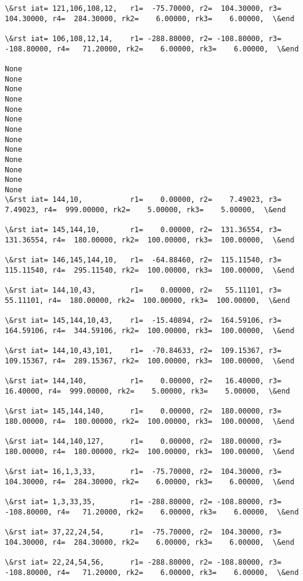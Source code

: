 \documentclass[11pt]{article}
\begin{document}
\begin{Verbatim}[commandchars=\\\{\}]
\&rst iat= 121,106,108,12,   r1=  -75.70000, r2=  104.30000, r3=  104.30000, r4=  284.30000, rk2=    6.00000, rk3=    6.00000,  \&end

\&rst iat= 106,108,12,14,    r1= -288.80000, r2= -108.80000, r3= -108.80000, r4=   71.20000, rk2=    6.00000, rk3=    6.00000,  \&end

None
None
None
None
None
None
None
None
None
None
None
None
None
\&rst iat= 144,10,           r1=    0.00000, r2=    7.49023, r3=    7.49023, r4=  999.00000, rk2=    5.00000, rk3=    5.00000,  \&end

\&rst iat= 145,144,10,       r1=    0.00000, r2=  131.36554, r3=  131.36554, r4=  180.00000, rk2=  100.00000, rk3=  100.00000,  \&end

\&rst iat= 146,145,144,10,   r1=  -64.88460, r2=  115.11540, r3=  115.11540, r4=  295.11540, rk2=  100.00000, rk3=  100.00000,  \&end

\&rst iat= 144,10,43,        r1=    0.00000, r2=   55.11101, r3=   55.11101, r4=  180.00000, rk2=  100.00000, rk3=  100.00000,  \&end

\&rst iat= 145,144,10,43,    r1=  -15.40894, r2=  164.59106, r3=  164.59106, r4=  344.59106, rk2=  100.00000, rk3=  100.00000,  \&end

\&rst iat= 144,10,43,101,    r1=  -70.84633, r2=  109.15367, r3=  109.15367, r4=  289.15367, rk2=  100.00000, rk3=  100.00000,  \&end

\&rst iat= 144,140,          r1=    0.00000, r2=   16.40000, r3=   16.40000, r4=  999.00000, rk2=    5.00000, rk3=    5.00000,  \&end

\&rst iat= 145,144,140,      r1=    0.00000, r2=  180.00000, r3=  180.00000, r4=  180.00000, rk2=  100.00000, rk3=  100.00000,  \&end

\&rst iat= 144,140,127,      r1=    0.00000, r2=  180.00000, r3=  180.00000, r4=  180.00000, rk2=  100.00000, rk3=  100.00000,  \&end

\&rst iat= 16,1,3,33,        r1=  -75.70000, r2=  104.30000, r3=  104.30000, r4=  284.30000, rk2=    6.00000, rk3=    6.00000,  \&end

\&rst iat= 1,3,33,35,        r1= -288.80000, r2= -108.80000, r3= -108.80000, r4=   71.20000, rk2=    6.00000, rk3=    6.00000,  \&end

\&rst iat= 37,22,24,54,      r1=  -75.70000, r2=  104.30000, r3=  104.30000, r4=  284.30000, rk2=    6.00000, rk3=    6.00000,  \&end

\&rst iat= 22,24,54,56,      r1= -288.80000, r2= -108.80000, r3= -108.80000, r4=   71.20000, rk2=    6.00000, rk3=    6.00000,  \&end


\end{Verbatim}
\end{document}
